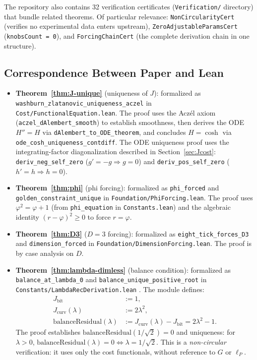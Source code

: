 \documentclass[12pt]{article}
\theoremstyle{definition}
\theoremstyle{remark}
\begin{document}
The repository also contains 32 verification certificates
(\texttt{Verification/} directory) that bundle related theorems.
Of particular relevance:
\texttt{NonCircularityCert} (verifies no experimental data enters
upstream),
\texttt{ZeroAdjustableParamsCert} (\texttt{knobsCount = 0}), and
\texttt{ForcingChainCert} (the complete derivation chain in one
structure).

\subsection{Correspondence Between Paper and Lean}

\begin{itemize}
  \item \textbf{Theorem~\ref{thm:J-unique}} (uniqueness of $J$):
    formalized as
    \texttt{washburn\_zlatanovic\_uniqueness\_aczel} in
    \texttt{Cost/FunctionalEquation.lean}. The proof uses the Acz\'el axiom
    (\texttt{aczel\_dAlembert\_smooth}) to establish smoothness, then
    derives the ODE $H'' = H$ via
    \texttt{dAlembert\_to\_ODE\_theorem}, and concludes $H = \cosh$
    via \texttt{ode\_cosh\_uniqueness\_contdiff}. The ODE uniqueness
    proof uses the integrating-factor diagonalization described in
    Section~\ref{sec:Jcost}: \texttt{deriv\_neg\_self\_zero} ($g' = -g
    \Rightarrow g = 0$) and \texttt{deriv\_pos\_self\_zero} ($h' = h
    \Rightarrow h = 0$).

  \item \textbf{Theorem~\ref{thm:phi}} (phi forcing): formalized as
    \texttt{phi\_forced} and \texttt{golden\_constraint\_unique} in
    \texttt{Foundation/PhiForcing.lean}. The proof uses
    $\varphi^2 = \varphi + 1$ (from \texttt{phi\_equation} in
    \texttt{Constants.lean}) and the algebraic identity
    $(r - \varphi)^2 \geq 0$ to force $r = \varphi$.

  \item \textbf{Theorem~\ref{thm:D3}} ($D = 3$ forcing): formalized
    as \texttt{eight\_tick\_forces\_D3} and \texttt{dimension\_forced}
    in \texttt{Foundation/DimensionForcing.lean}. The proof is by case
    analysis on $D$.

  \item \textbf{Theorem~\ref{thm:lambda-dimless}} (balance condition):
    formalized as \texttt{balance\_at\_lambda\_0} and
    \texttt{balance\_unique\_positive\_root} in
    \texttt{Constants/LambdaRecDerivation.lean}
    \cite{WashburnLean4Repo2026}. The module defines:
    \begin{align*}
      J_{\mathrm{bit}} &:= 1, \\
      J_{\mathrm{curv}}(\lambda) &:= 2\lambda^2, \\
      \text{balanceResidual}(\lambda) &:=
        J_{\mathrm{curv}}(\lambda) - J_{\mathrm{bit}}
        = 2\lambda^2 - 1.
    \end{align*}
    The proof establishes
    $\text{balanceResidual}(1/\sqrt{2}) = 0$ and uniqueness:
    for $\lambda > 0$,
    $\text{balanceResidual}(\lambda) = 0 \Leftrightarrow
    \lambda = 1/\sqrt{2}$.
    This is a \emph{non-circular} verification: it uses only the
    cost functionals, without reference to $G$ or $\ell_P$.


\end{itemize}
\end{document}
